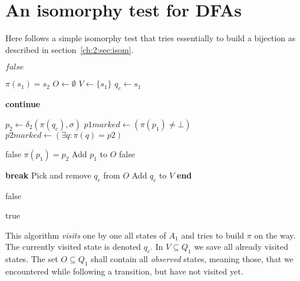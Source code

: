 
\chapter{An isomorphy test for DFAs}\label{ch:app:ism-test}

Here follows a simple isomorphy test that tries essentially to build a bijection as described in section~\ref{ch:2:sec:isom}.
\vspace{0.2cm}
\begin{algorithmic}[1]
			\State \Return $false$
		\EndIf
		
		\State $\pi(s_1) = s_2$ 
		\State $O \gets \emptyset$ 
		\State $V \gets \{s_1\}$ 
		\State $q_c \gets s_1$ 
		
			 
					\State \textbf{continue}
				\EndIf
				
				\State
				
				\State $p_2 \gets \delta_2(\pi(q_c), \sigma)$ 
				\State $p1marked \gets (\pi(p_1) \neq \bot)$ 
				\State $p2marked \gets (\exists q\colon \pi(q)=p2)$
				
				\State
				
						\State \Return false
					\EndIf
					\State $\pi(p_1) = p_2$
					\State Add $p_1$ to $O$
				\EndIf
				\Else {}
					\State \Return false
				\EndIf
			\EndFor	
			
				\State \textbf{break}
			\EndIf
			\State Pick and remove $q_c$ from $O$
			\State Add $q_c$ to $V$
		\EndWhile
		\State\textbf{end}
		
				\State \Return false
			\EndIf
		\EndFor	
		
		\State \Return true
	\EndFunction
\end{algorithmic}
\vspace{0.2cm}
This algorithm \emph{visits} one by one all states of $A_1$ and tries to build $\pi$ on the way. The currently visited state is denoted $q_c$. In $V \subseteq Q_1$ we save all already visited states. The set $O \subseteq Q_1$ shall contain all \emph{observed} states, meaning those, that we encountered while following a transition, but have not visited yet.

